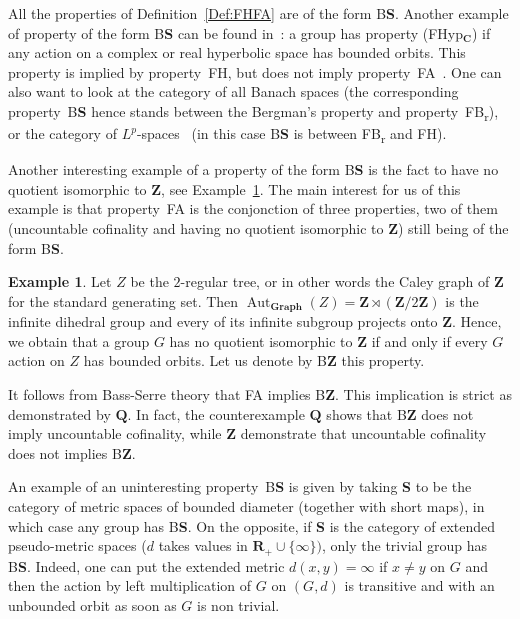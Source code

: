 \documentclass[a4paper]{article}
\theoremstyle{definition}
\newtheorem{exmp}[lem]{Example}
\DeclareMathOperator\Aut{Aut}
\newcommand*{\field}[1]{\mathbf{#1}}
\newcommand*{\category}[1]{\textbf{#1}}
\newcommand*{\CatS}{\category{S}}
\newcommand*{\Z}{\field{Z}}
\newcommand*{\R}{\field{R}}
\newcommand*{\BS}{B\textbf{S}}
\newcommand*{\BZ}{B\textbf{Z}}
\newcommand*{\FB}{FB\textsubscript{r}}
\newcommand*{\FH}{FH}
\newcommand*{\FA}{FA}
\begin{document}
All the properties of Definition~\ref{Def:FHFA} are of the form \BS.
Another example of property of the form \BS{} can be found in~\cite[Definition 6.22]{MR1023471}: a group has property (FHyp$_{\field{C}}$) if any action on a complex or real hyperbolic space has bounded orbits.
This property is implied by property~\FH, but does not imply property~\FA{}~\cite[Corollary 6.23 and Example 6.24]{MR1023471}.
One can also want to look at the category of all Banach spaces (the corresponding property~\BS{} hence stands between the Bergman's property and property~\FB), or the category of $L^p$-spaces~\cite{MR2978328} (in this case \BS{} is between \FB{} and \FH).

Another interesting example of a property of the form \BS{} is the fact to have no quotient isomorphic to $\Z$, see Example~\ref{Exmp:BZ}.
The main interest for us of this example is that property~\FA{} is the conjonction of three properties, two of them (uncountable cofinality and having no quotient isomorphic to $\Z$) still being of the form \BS.
%
%
\begin{exmp}\label{Exmp:BZ}
Let $Z$ be the $2$-regular tree, or in other words the Caley graph of $\Z$ for the standard generating set.
Then $\Aut_{\mathbf{Graph}}(Z)=\Z\rtimes (\Z/2\Z)$ is the infinite dihedral group and every of its infinite subgroup projects onto $\Z$.
Hence, we obtain that a group $G$ has no quotient isomorphic to $\Z$ if and only if every $G$ action on $Z$ has bounded orbits.
Let us denote by \BZ{} this property.

It follows from Bass-Serre theory that \FA{} implies \BZ. This implication is strict as demonstrated by $\field{Q}$.
In fact, the counterexample $\field{Q}$ shows that \BZ{} does not imply uncountable cofinality, while $\Z$ demonstrate that uncountable cofinality does not implies \BZ.
\end{exmp}
%
%
An example of an uninteresting property~\BS{} is given by taking \CatS{} to be the category of metric spaces of bounded diameter (together with short maps), in which case any group has \BS.
On the opposite, if \CatS{} is the category of extended pseudo-metric spaces ($d$ takes values in $\R_+\cup\{\infty\})$, only the trivial group has \BS.
Indeed, one can put the extended metric $d(x,y)=\infty$ if $x\neq y$ on $G$ and then the action by left multiplication of $G$ on $(G,d)$ is transitive and with an unbounded orbit as soon as $G$ is non trivial.
\end{document}
